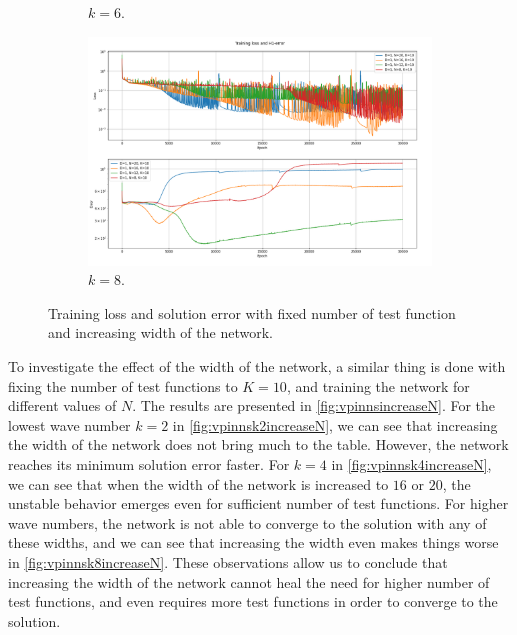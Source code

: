 \begin{figure}[h!]
\begin{subfigure}[b]{0.48\textwidth}
        \caption{$k=6$.}
        \label{fig:vpinnsk6increaseN}
    \end{subfigure}
    \hfill
    \begin{subfigure}[b]{0.48\textwidth}
        \includegraphics[width=\textwidth]{img/VPINN-Comparison-k8increaseN.png}
        \caption{$k=8$.}
        \label{fig:vpinnsk8increaseN}
    \end{subfigure}
    \caption{Training loss and solution error with fixed number of test function and increasing width of the network.}
    \label{fig:vpinnsincreaseN}
\end{figure}

To investigate the effect of the width of the network, a similar thing is done with fixing the number of test functions to $K=10$, and training the network for different values of $N$. The results are presented in \autoref{fig:vpinnsincreaseN}. For the lowest wave number $k=2$ in \autoref{fig:vpinnsk2increaseN}, we can see that increasing the width of the network does not bring much to the table. However, the network reaches its minimum solution error faster. For $k=4$ in \autoref{fig:vpinnsk4increaseN}, we can see that when the width of the network is increased to $16$ or $20$, the unstable behavior emerges even for sufficient number of test functions. For higher wave numbers, the network is not able to converge to the solution with any of these widths, and we can see that increasing the width even makes things worse in \autoref{fig:vpinnsk8increaseN}. These observations allow us to conclude that increasing the width of the network cannot heal the need for higher number of test functions, and even requires more test functions in order to converge to the solution.

